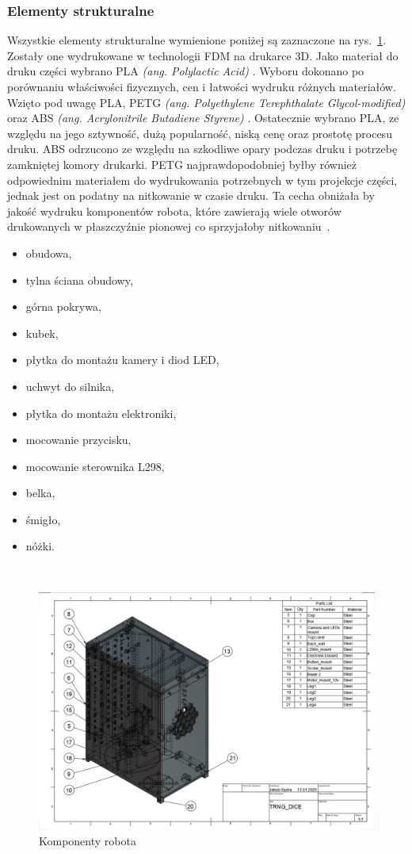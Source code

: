 \subsubsection{Elementy strukturalne}
Wszystkie elementy strukturalne wymienione poniżej są zaznaczone na rys.~\ref{fig:komponenty}. Zostały one wydrukowane w technologii FDM na drukarce 3D. Jako materiał do druku części wybrano
PLA \textit{(ang. Polylactic Acid)} \cite{plaprusa}. Wyboru dokonano po porównaniu właściwości fizycznych, cen i łatwości wydruku różnych materiałów. Wzięto pod uwagę
PLA, PETG \textit{(ang. Polyethylene Terephthalate Glycol-modified)} \cite{PETG} oraz ABS \textit{(ang. Acrylonitrile Butadiene Styrene)} \cite{ABS}. Ostatecznie wybrano PLA, ze względu na jego sztywność, dużą popularność,
niską cenę oraz prostotę procesu druku. ABS odrzucono ze względu na szkodliwe opary podczas druku i potrzebę zamkniętej komory drukarki. PETG najprawdopodobniej
byłby również odpowiednim materiałem do wydrukowania potrzebnych w tym projekcje części, jednak jest on podatny na nitkowanie w czasie druku. Ta cecha
obniżała by jakość wydruku komponentów robota, które zawierają wiele otworów drukowanych w płaszczyźnie pionowej co sprzyjałoby nitkowaniu~\cite{PLA, PLA2}.
    \begin{itemize}
        \item obudowa,
        \item tylna ściana obudowy,
        \item górna pokrywa,
        \item kubek,
        \item płytka do montażu kamery i diod LED,
        \item uchwyt do silnika,
        \item płytka do montażu elektroniki,
        \item mocowanie przycisku,
        \item mocowanie sterownika L298,
        \item belka,
        \item śmigło,
        \item nóżki.
    \end{itemize}\
    \begin{figure}[H]
        \centering
        \includegraphics[width=0.95\linewidth]{chapters/03-praca-wlasna/figures/komponenty}
        \caption{\label{fig:komponenty}Komponenty robota}
    \end{figure}

